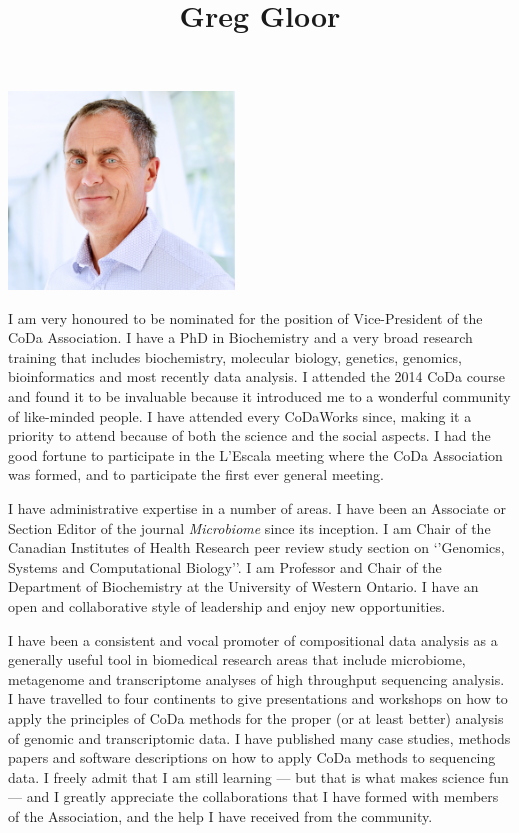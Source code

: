 \documentclass[onecolumn]{article}
\title{Greg Gloor}
\author{}
\date{\vspace{-2.5em}}
\begin{document}
\maketitle

\vspace{-1cm}

\begin{center}
\includegraphics[width=0.45\textwidth,height=\textheight]{gg_head.pdf}
\end{center}
I am very honoured to be nominated for the position of Vice-President of
the CoDa Association. I have a PhD in Biochemistry and a very broad
research training that includes biochemistry, molecular biology,
genetics, genomics, bioinformatics and most recently data analysis. I
attended the 2014 CoDa course and found it to be invaluable because it introduced me to a wonderful
community of like-minded people. I have attended every CoDaWorks since,
making it a priority  to attend because of both the science and the
social aspects. I had the good fortune to participate in the  L'Escala meeting where the CoDa Association was formed, and to participate the first ever general meeting.

I have administrative expertise in a number of areas. I have been an
Associate or Section Editor of the journal \emph{Microbiome} since its
inception. I am Chair of the Canadian Institutes of Health Research peer
review study section on `'Genomics, Systems and Computational Biology''.
I am Professor and Chair of the Department of Biochemistry at the
University of Western Ontario. I have an open and collaborative style of
leadership and enjoy new opportunities.

I have been a consistent and vocal promoter of compositional data
analysis as a generally useful tool in biomedical research areas
that include microbiome, metagenome and transcriptome analyses of high
throughput sequencing analysis. I have travelled to four continents to
give presentations and workshops on how to apply the principles of CoDa
methods for the proper (or at least better) analysis of genomic and
transcriptomic data. I have published many case studies, methods papers
and software descriptions on how to apply CoDa methods to sequencing
data. I freely admit that I am still learning --- but that is what makes
science fun --- and I greatly appreciate the collaborations that I have
formed with members of the Association, and the help I have received from the community.
\end{document}
